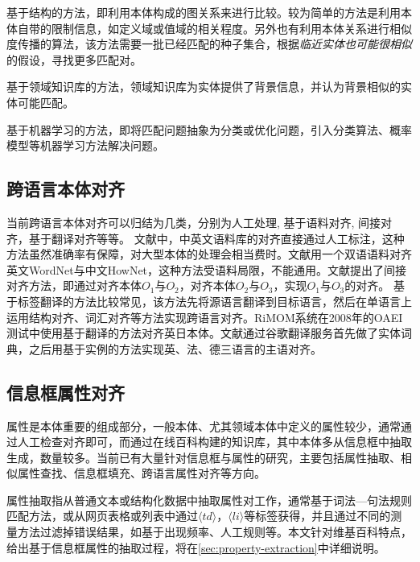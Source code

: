 {\heiti 基于结构的方法\cite{hu2008matching}}，即利用本体构成的图关系来进行比较。较为简单的方法是利用本体自带的限制信息，如定义域或值域的相关程度。另外也有利用本体关系进行相似度传播的算法，该方法需要一批已经匹配的种子集合，根据\textit{临近实体也可能很相似}的假设，寻找更多匹配对。

{\heiti 基于领域知识库的方法\cite{ponzetto2009large,gligorov2007using}}，领域知识库为实体提供了背景信息，并认为背景相似的实体可能匹配。

{\heiti 基于机器学习的方法\cite{niepert2010probabilistic,albagli2012markov}}，即将匹配问题抽象为分类或优化问题，引入分类算法、概率模型等机器学习方法解决问题。


\subsection{跨语言本体对齐}
当前跨语言本体对齐可以归结为几类，分别为人工处理\cite{liang2006mapping}, 基于语料对齐\cite{ngai2002identifying}, 间接对齐\cite{jung2009indirect}，基于翻译对齐\cite{zhang2008rimom,wang2009matching}等等。 文献\cite{liang2006mapping}中，中英文语料库的对齐直接通过人工标注，这种方法虽然准确率有保障，对大型本体的处理会相当费时。文献\cite{ngai2002identifying}用一个双语语料对齐英文WordNet与中文HowNet，这种方法受语料局限，不能通用。文献\cite{jung2009indirect}提出了间接对齐方法，即通过对齐本体$O_1$与$O_2$，对齐本体$O_2$与$O_3$，实现$O_1$与$O_3$的对齐。 
基于标签翻译的方法比较常见，该方法先将源语言翻译到目标语言，然后在单语言上运用结构对齐、词汇对齐等方法实现跨语言对齐。RiMOM系统\cite{zhang2008rimom}在2008年的OAEI测试中使用基于翻译的方法对齐英日本体。文献\cite{wang2009matching}通过谷歌翻译服务首先做了实体词典，之后用基于实例的方法实现英、法、德三语言的主语对齐。

\subsection{信息框属性对齐}
\label{sec:property-research}
属性是本体重要的组成部分，一般本体、尤其领域本体中定义的属性较少，通常通过人工检查对齐即可\cite{wang:movie}，而通过在线百科构建的知识库，其中本体多从信息框中抽取生成，数量较多。当前已有大量针对信息框与属性的研究，主要包括属性抽取、相似属性查找、信息框填充、跨语言属性对齐等方向。

{\heiti 属性抽取}指从普通文本或结构化数据中抽取属性对工作，通常基于词法—句法规则匹配方法\cite{pacsca2007role,lee2013attribute}，或从网页表格或列表中通过$\langle td\rangle$，$\langle li\rangle$等标签获得\cite{crestan2010web}，并且通过不同的测量方法过滤掉错误结果，如基于出现频率\cite{pacsca2007role}、人工规则\cite{lee2013attribute}等。本文针对维基百科特点，给出基于信息框属性的抽取过程，将在\ref{sec:property-extraction}中详细说明。

